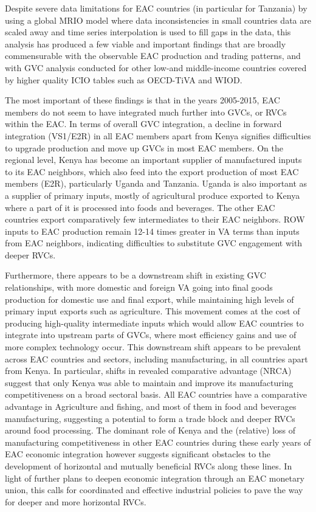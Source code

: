 \documentclass[a4paper]{article}
\begin{document}
Despite severe data limitations for EAC countries (in particular for Tanzania) by using a global MRIO model where data inconsistencies in small countries data are scaled away and time series interpolation is used to fill gaps in the data, this analysis has produced a few viable and important findings that are broadly commensurable with the observable EAC production and trading patterns, and with GVC analysis conducted for other low-and middle-income countries covered by higher quality ICIO tables such as OECD-TiVA and WIOD. \newline

The most important of these findings is that in the years 2005-2015, EAC members do not seem to have integrated much further into GVCs, or RVCs within the EAC. In terms of overall GVC integration, a decline in forward integration (VS1/E2R) in all EAC members apart from Kenya signifies difficulties to upgrade production and move up GVCs in most EAC members.  On the regional level, Kenya has become an important supplier of manufactured inputs to its EAC neighbors, which also feed into the export production of most EAC members (E2R), particularly Uganda and Tanzania. Uganda is also important as a supplier of primary inputs, mostly of agricultural produce exported to Kenya where a part of it is processed into foods and beverages. The other EAC countries export comparatively few intermediates to their EAC neighbors. ROW inputs to EAC production remain 12-14 times greater in VA terms than inputs from EAC neighbors, indicating difficulties to substitute GVC engagement with deeper RVCs.  \newline

Furthermore, there appears to be a downstream shift in existing GVC relationships, with more domestic and foreign VA going into final goods production for domestic use and final export, while maintaining high levels of primary input exports such as agriculture. This movement comes at the cost of producing high-quality intermediate inputs which would allow EAC countries to integrate into upstream parts of GVCs, where most efficiency gains and use of more complex technology occur. This downstream shift appears to be prevalent across EAC countries and sectors, including manufacturing, in all countries apart from Kenya. In particular, shifts in revealed comparative advantage (NRCA) suggest that only Kenya was able to maintain and improve its manufacturing competitiveness on a broad sectoral basis. All EAC countries have a comparative advantage in Agriculture and fishing, and most of them in food and beverages manufacturing, suggesting a potential to form a trade block and deeper RVCs around food processing. The dominant role of Kenya and the (relative) loss of manufacturing competitiveness in other EAC countries during these early years of EAC economic integration however suggests significant obstacles to the development of horizontal and mutually beneficial RVCs along these lines. In light of further plans to deepen economic integration through an EAC monetary union, this calls for coordinated and effective industrial policies to pave the way for deeper and more horizontal RVCs. \newline 
\end{document}

